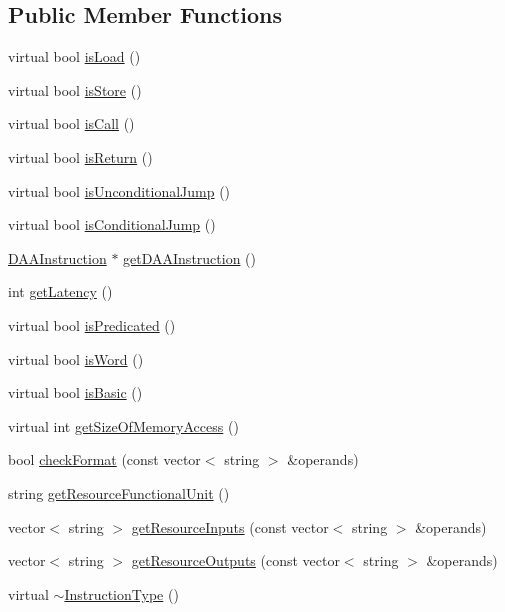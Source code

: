 \subsection*{Public Member Functions}
\begin{DoxyCompactItemize}
\item 
virtual bool \hyperlink{classInstructionType_aa3d2c042a4109b1d96dc0d7f20916ba3}{is\+Load} ()
\item 
virtual bool \hyperlink{classInstructionType_aa81de3619fb9d88f52d7d8104f9ac188}{is\+Store} ()
\item 
virtual bool \hyperlink{classInstructionType_ad49a039e3b57e3b7b369a7c0c6c0932b}{is\+Call} ()
\item 
virtual bool \hyperlink{classInstructionType_a15b0f034f3536f0bc525550406e1d7c6}{is\+Return} ()
\item 
virtual bool \hyperlink{classInstructionType_a145a4e04a4db8a0ecf9e4b35b2403ed3}{is\+Unconditional\+Jump} ()
\item 
virtual bool \hyperlink{classInstructionType_a3655591172fa6acbf7b9888e879b551d}{is\+Conditional\+Jump} ()
\item 
\hyperlink{classDAAInstruction}{D\+A\+A\+Instruction} $\ast$ \hyperlink{classInstructionType_aed61394dd1528a3a68c09bef157e6da8}{get\+D\+A\+A\+Instruction} ()
\item 
int \hyperlink{classInstructionType_a737bd48f4e73da7c3a52faa052d9edfe}{get\+Latency} ()
\item 
virtual bool \hyperlink{classInstructionType_a5b28d5b2e495222817facca7b8826975}{is\+Predicated} ()
\item 
virtual bool \hyperlink{classInstructionType_ab4c4569a2cafed0655f95d9a20bd8ea1}{is\+Word} ()
\item 
virtual bool \hyperlink{classInstructionType_ada75c9091ab7e6b4b9a7df984288d1f8}{is\+Basic} ()
\item 
virtual int \hyperlink{classInstructionType_a40c94ccf0b13f186524e06972f08bca3}{get\+Size\+Of\+Memory\+Access} ()
\item 
bool \hyperlink{classInstructionType_a0711bca7a3ca0a21ff6b9ae940c13acf}{check\+Format} (const vector$<$ string $>$ \&operands)
\item 
string \hyperlink{classInstructionType_adf12516c59a85e8032770feec2e1dcae}{get\+Resource\+Functional\+Unit} ()
\item 
vector$<$ string $>$ \hyperlink{classInstructionType_acce0f34d0675a5e29518ecba9bcb13c1}{get\+Resource\+Inputs} (const vector$<$ string $>$ \&operands)
\item 
vector$<$ string $>$ \hyperlink{classInstructionType_a96e341d8911549b19e8d975297e3e131}{get\+Resource\+Outputs} (const vector$<$ string $>$ \&operands)
\item 
virtual \hyperlink{classInstructionType_ae3415fa195f43d8fd0c4c66fab307e3d}{$\sim$\+Instruction\+Type} ()
\end{DoxyCompactItemize}
